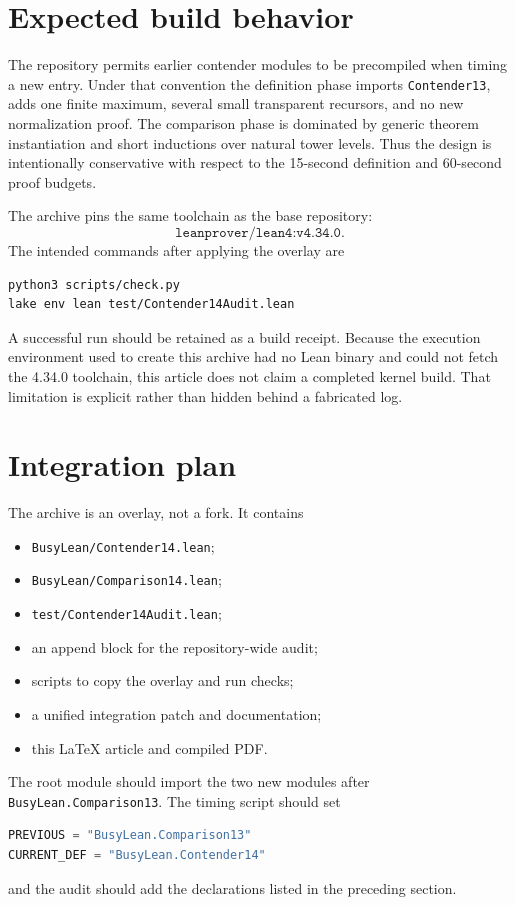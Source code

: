 \documentclass[11pt]{article}
\theoremstyle{definition}
\newcommand{\lean}[1]{\texttt{#1}}
\begin{document}
\section{Expected build behavior}

The repository permits earlier contender modules to be precompiled when timing
a new entry.  Under that convention the definition phase imports
\lean{Contender13}, adds one finite maximum, several small transparent
recursors, and no new normalization proof.  The comparison phase is dominated
by generic theorem instantiation and short inductions over natural tower
levels.  Thus the design is intentionally conservative with respect to the
15-second definition and 60-second proof budgets.

The archive pins the same toolchain as the base repository:
\[
  \lean{leanprover/lean4:v4.34.0}.
\]
The intended commands after applying the overlay are
\begin{lstlisting}[language={}]
python3 scripts/check.py
lake env lean test/Contender14Audit.lean
\end{lstlisting}
A successful run should be retained as a build receipt.  Because the execution
environment used to create this archive had no Lean binary and could not fetch
the 4.34.0 toolchain, this article does not claim a completed kernel build.
That limitation is explicit rather than hidden behind a fabricated log.

\section{Integration plan}

The archive is an overlay, not a fork.  It contains
\begin{itemize}
  \item \lean{BusyLean/Contender14.lean};
  \item \lean{BusyLean/Comparison14.lean};
  \item \lean{test/Contender14Audit.lean};
  \item an append block for the repository-wide audit;
  \item scripts to copy the overlay and run checks;
  \item a unified integration patch and documentation;
  \item this \LaTeX{} article and compiled PDF.
\end{itemize}

The root module should import the two new modules after
\lean{BusyLean.Comparison13}.  The timing script should set
\begin{lstlisting}[language=Python]
PREVIOUS = "BusyLean.Comparison13"
CURRENT_DEF = "BusyLean.Contender14"
\end{lstlisting}
and the audit should add the declarations listed in the preceding section.
\end{document}
